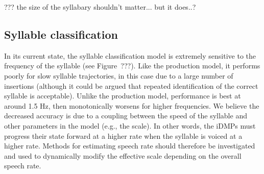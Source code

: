 ??? the size of the syllabary shouldn't matter... but it does..?









\subsection{Syllable classification}

In its current state,
the syllable classification model
is extremely sensitive to the
frequency of the syllable
(see Figure~???).
Like the production model,
it performs poorly for
slow syllable trajectories,
in this case due to
a large number of insertions
(although it could be argued that
repeated identification of the correct
syllable is acceptable).
Unlike the production model,
performance is best at around 1.5 Hz,
then monotonically worsens
for higher frequencies.
We believe the decreased accuracy
is due to a coupling between
the speed of the syllable
and other parameters in the model
(e.g., the scale).
In other words, the iDMPs
must progress their state forward
at a higher rate when
the syllable is voiced at a higher rate.
Methods for estimating speech rate
should therefore be investigated
and used to dynamically modify
the effective scale
depending on the overall speech rate.

